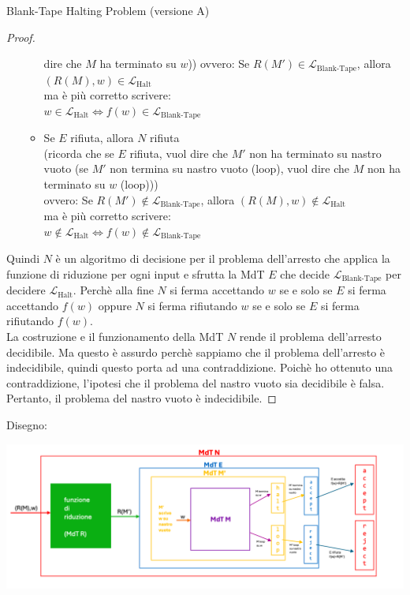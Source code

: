 \documentclass{article}  %
\theoremstyle{definition}
\begin{document}
\begin{theorem}{Blank-Tape Halting Problem (versione A)}
\begin{proof}
\begin{enumerate}
\begin{itemize}
				            dire che $M$ ha terminato su $w$))
				            ovvero: Se $R(M') \in \mathcal{L}_{\text{Blank-Tape}}$, allora $(R(M),w) \in \mathcal{L}_{\text{Halt}}$ \\
				            ma è più corretto scrivere: \\
				            $w \in \mathcal{L}_{\text{Halt}} \iff  f(w) \in \mathcal{L}_{\text{Blank-Tape}}$
				      \item Se $E$ rifiuta, allora $N$ rifiuta \\
				            (ricorda che se $E$ rifiuta, vuol dire che $M'$ non ha terminato su nastro vuoto (se $M'$ non termina su nastro vuoto (loop), vuol
				            dire che $M$ non ha terminato su $w$ (loop))) \\
				            ovvero: Se $R(M') \notin \mathcal{L}_{\text{Blank-Tape}}$, allora $(R(M),w) \notin \mathcal{L}_{\text{Halt}}$ \\
				            ma è più corretto scrivere: \\
				            $w \notin \mathcal{L}_{\text{Halt}} \iff f(w) \notin \mathcal{L}_{\text{Blank-Tape}}$
			      \end{itemize}
		\end{enumerate}
		Quindi $N$ è un algoritmo di decisione per il problema dell'arresto che applica la funzione di riduzione per ogni input e sfrutta
		la MdT $E$ che decide $\mathcal{L}_{\text{Blank-Tape}}$ per decidere $\mathcal{L}_{\text{Halt}}$. Perchè alla fine $N$ si ferma
		accettando $w$ se e solo se $E$ si ferma accettando $f(w)$ oppure $N$ si ferma
		rifiutando $w$ se e solo se $E$ si ferma rifiutando $f(w)$. \\
		La costruzione e il funzionamento della MdT $N$ rende il problema dell'arresto decidibile. Ma questo è assurdo perchè sappiamo
		che il problema dell'arresto è indecidibile, quindi questo porta ad una contraddizione. Poichè ho ottenuto una contraddizione, l'ipotesi
		che il problema del nastro vuoto sia decidibile è falsa. Pertanto, il problema del nastro vuoto è indecidibile.
	\end{proof}
	Disegno: \\
	\begin{center}
		\includegraphics[width=0.9\linewidth]{BTHP.png}
	\end{center}
\end{theorem}
\end{document}

